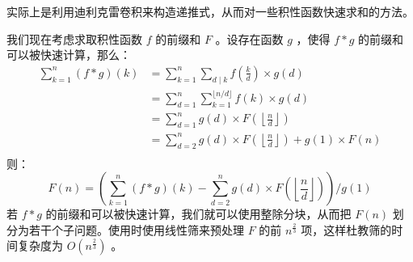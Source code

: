 实际上是利用迪利克雷卷积来构造递推式，从而对一些积性函数快速求和的方法。

我们现在考虑求取积性函数 $f$ 的前缀和 $F$ 。设存在函数 $g$ ，使得 $f*g$ 的前缀和可以被快速计算，那么：
$$
\begin{aligned}
	\sum_{k=1}^n(f*g)(k)
	&=\sum_{k=1}^n\sum_{d\mid k}f\left(\frac kd\right)\times g(d)\\
	&=\sum_{d=1}^n\sum_{k=1}^{\lfloor n/ d \rfloor} f(k) \times g(d)\\
	&=\sum_{d=1}^ng(d)\times F\left(\left\lfloor\frac nd\right\rfloor\right)\\
	&=\sum_{d=2}^ng(d)\times F\left(\left\lfloor\frac nd\right\rfloor\right)+g(1)\times F(n)\\
\end{aligned}
$$
则：
$$
F(n)=\left(\sum_{k=1}^n(f*g)(k)-\sum_{d=2}^ng(d)\times F\left(\left\lfloor\frac nd\right\rfloor\right)\right){\bigg /} g(1)
$$
若 $f*g$ 的前缀和可以被快速计算，我们就可以使用整除分块，从而把 $F(n)$ 划分为若干个子问题。使用时使用线性筛来预处理 $F$ 的前 $n^{\frac 23}$ 项，这样杜教筛的时间复杂度为 $O(n^{\frac 23})$ 。